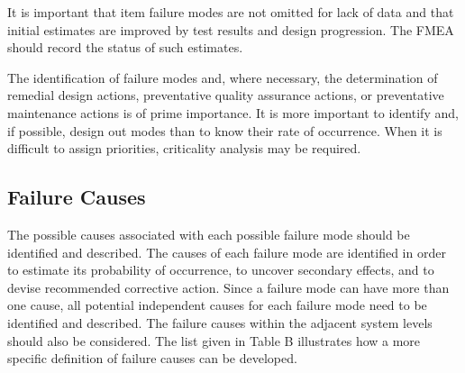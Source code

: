 \documentclass[./dissertation.tex]{subfiles}
\begin{document}
It is important that item failure modes are not omitted for lack of data and that initial estimates are improved by test results and design progression. The FMEA should record the status of such estimates.

The identification of failure modes and, where necessary, the determination of remedial design actions, preventative quality assurance actions, or preventative maintenance actions is of prime importance. It is more important to identify and, if possible, design out modes than to know their rate of occurrence. When it is difficult to assign priorities, criticality analysis may be required.






\subsection{Failure Causes}
The possible causes associated with each possible failure mode should be identified and described. The causes of each failure mode are identified in order to estimate its probability of occurrence, to uncover secondary effects, and to devise recommended corrective action. Since a failure mode can have more than one cause, all potential independent causes for each failure mode need to be identified and described. The failure causes within the adjacent system levels should also be considered. The list given in Table B illustrates how a more specific definition of failure causes can be developed.
\end{document}
